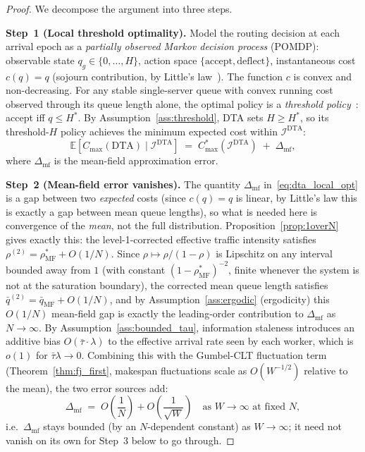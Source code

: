 \documentclass[11pt,a4paper]{article}
\newcommand{\rhostar}{\rho^{*}}
\begin{document}
\begin{proof}
We decompose the argument into three steps.

\medskip
\noindent\textbf{Step~1 (Local threshold optimality).}
Model the routing decision at each arrival epoch as a
\emph{partially observed Markov decision process} (POMDP):
observable state $q_g \in \{0,\ldots,H\}$, action space
$\{\mathrm{accept}, \mathrm{deflect}\}$, instantaneous cost
$c(q) = q$ (sojourn contribution, by Little's law~\cite{little1961}).
The function $c$ is convex and non-decreasing.
For any stable single-server queue with convex running cost observed
through its queue length alone, the optimal policy is a
\emph{threshold policy}~\cite{stidham1985}: accept iff $q \leq H^*$.
By Assumption~\ref{ass:threshold}, DTA sets $H \geq H^*$, so its
threshold-$H$ policy achieves the minimum expected cost within
$\mathcal{I}^{\mathrm{DTA}}$:
\begin{equation}\label{eq:dta_local_opt}
  \mathbb{E}[C_{\max}(\mathrm{DTA}) \mid \mathcal{I}^{\mathrm{DTA}}]
  \;=\;
  C_{\max}^*(\mathcal{I}^{\mathrm{DTA}}) \;+\; \Delta_{\mathrm{mf}},
\end{equation}
where $\Delta_{\mathrm{mf}}$ is the mean-field approximation error.

\medskip
\noindent\textbf{Step~2 (Mean-field error vanishes).}
The quantity $\Delta_{\mathrm{mf}}$ in~\eqref{eq:dta_local_opt} is a gap
between two \emph{expected} costs (since $c(q)=q$ is linear, by Little's
law this is exactly a gap between mean queue lengths), so what is needed
here is convergence of the \emph{mean}, not the full distribution.
Proposition~\ref{prop:1overN} gives exactly this: the level-1-corrected
effective traffic intensity satisfies
$\rho^{(2)} = \rhostar_{\mathrm{MF}} + O(1/N)$. Since
$\rho \mapsto \rho/(1-\rho)$ is Lipschitz on any interval bounded away
from $1$ (with constant $(1-\rhostar_{\mathrm{MF}})^{-2}$, finite
whenever the system is not at the saturation boundary), the corrected
mean queue length satisfies
$\bar q^{(2)} = \bar q_{\mathrm{MF}} + O(1/N)$, and by
Assumption~\ref{ass:ergodic} (ergodicity) this $O(1/N)$ mean-field gap
is exactly the leading-order contribution to $\Delta_{\mathrm{mf}}$ as
$N\to\infty$. By Assumption~\ref{ass:bounded_tau}, information staleness introduces
an additive bias $O(\bar\tau \cdot \lambda)$ to the effective arrival
rate seen by each worker, which is $o(1)$ for $\bar\tau \lambda \to 0$.
Combining this with the Gumbel-CLT fluctuation term (Theorem~\ref{thm:fj_first},
makespan fluctuations scale as $O(W^{-1/2})$ relative to the mean), the two
error sources add:
\[
  \Delta_{\mathrm{mf}} \;=\; O\!\left(\frac{1}{N}\right) + O\!\left(\frac{1}{\sqrt{W}}\right)
  \quad\text{as } W \to \infty \text{ at fixed } N,
\]
i.e.\ $\Delta_{\mathrm{mf}}$ stays bounded (by an $N$-dependent constant) as
$W\to\infty$; it need not vanish on its own for Step~3 below to go through.


\end{proof}
\end{document}
